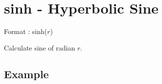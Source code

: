 
%

\section{sinh - Hyperbolic Sine\label{sect:sinh}}

Format : sinh($r$)

Calculate sine of radian $r$.

\subsection*{Example}


%

